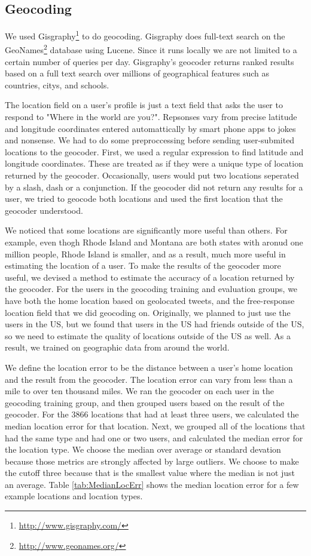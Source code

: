 \documentclass{sig-alternate}
\begin{document}
\subsection{Geocoding}
We used Gisgraphy\footnote{\url{http://www.gisgraphy.com/}} to do geocoding.
Gisgraphy does full-text search on the GeoNames\footnote{\url{http://www.geonames.org/}}
database using Lucene. Since
it runs locally we are not limited to a certain number of queries per day.
Gisgraphy's geocoder returns ranked results based on a full text search
over millions of geographical features such as countries, citys, and schools. 

The location field on a user's profile is just a text field that asks the user to respond to "Where in the world are you?".
Repsonses vary from precise latitude and longitude coordinates entered automattically by smart phone apps to jokes and nonsense.
We had to do some preproccessing before sending user-submited locations to the geocoder.
First, we used a regular expression to find latitude and longitude coordinates. These are treated as if they were a unique type of location returned by the geocoder.
Occasionally, users would put two locations seperated by a slash, dash or a conjunction. If the geocoder did not return any results for a user, we tried to geocode both locations and used the first location that the geocoder understood.

We noticed that some locations are significantly more useful than others.
For example, even thogh Rhode Island and Montana are both states with aronud
one million people, Rhode Island is smaller, and as a result, much more useful
in estimating the location of a user.
To make the results of the geocoder more useful, we devised a method to estimate the accuracy of a location returned by the geocoder.
For the users in the geocoding training and evaluation groups, we have both the
home location based on geolocated tweets, and the free-response location field
that we did geocoding on.
Originally, we planned to just use the users in the US, but we found that users
in the US had friends outside of the US, so we need to estimate the quality of
locations outside of the US as well.
As a result, we trained on geographic data from around the world.

We define the location error to be the distance between a user's home location and the result from the geocoder.
The location error can vary from less than a mile to over ten thousand miles.
We ran the geocoder on each user in the geocoding training group, and then grouped users based on the result of the geocoder.
For the 3866 locations that had at least three users, we calculated the median location error for that location.
Next, we grouped all of the locations that had the same type and had one or two users, and calculated the median error for the location type.
We choose the median over average or standard devation because those metrics are strongly affected by large outliers.
We choose to make the cutoff three because that is the smallest value where the median is not just an average.
Table \ref{tab:MedianLocErr} shows the median location error for a few example locations and location types.
\end{document}
